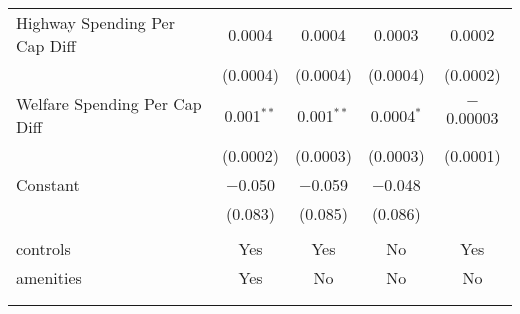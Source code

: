 \begin{table}[!htbp]
\begin{tabular}{@{\extracolsep{5pt}}lcccc}
  Highway Spending Per Cap Diff & 0.0004 & 0.0004 & 0.0003 & 0.0002 \\ 
  & (0.0004) & (0.0004) & (0.0004) & (0.0002) \\ 
  Welfare Spending Per Cap Diff & 0.001$^{**}$ & 0.001$^{**}$ & 0.0004$^{*}$ & $-$0.00003 \\ 
  & (0.0002) & (0.0003) & (0.0003) & (0.0001) \\ 
  Constant & $-$0.050 & $-$0.059 & $-$0.048 &  \\ 
  & (0.083) & (0.085) & (0.086) &  \\ 
 \hline \\[-1.8ex] 
controls & Yes & Yes & No & Yes \\ 
amenities & Yes & No & No & No \\ 
\hline \\[-1.8ex] 
\hline 
\hline \\[-1.8ex] 
\end{tabular} 
\end{table} 
